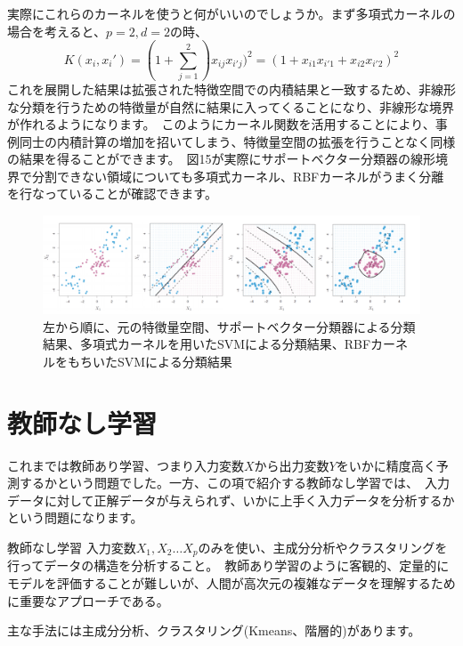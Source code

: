 \documentclass[uplatex]{jsarticle}
\begin{document}
実際にこれらのカーネルを使うと何がいいのでしょうか。まず多項式カーネルの場合を考えると、$p=2, d=2$の時、
$$K(x_i, x_i') = (1 + \sum_{j=1}^2)x_{ij}x_{i'j})^2 = (1 + x_{i1}x_{i'1} + x_{i2}x_{i'2})^2$$
これを展開した結果は拡張された特徴空間での内積結果と一致するため、非線形な分類を行うための特徴量が自然に結果に入ってくることになり、非線形な境界が作れるようになります。\
このようにカーネル関数を活用することにより、事例同士の内積計算の増加を招いてしまう、特徴量空間の拡張を行うことなく同様の結果を得ることができます。\
図15が実際にサポートベクター分類器の線形境界で分割できない領域についても多項式カーネル、RBFカーネルがうまく分離を行なっていることが確認できます。
\begin{figure}
  \begin{center}
    \includegraphics[width=15cm]{img/svm_c.png}
    \caption{左から順に、元の特徴量空間、サポートベクター分類器による分類結果、多項式カーネルを用いたSVMによる分類結果、RBFカーネルをもちいたSVMによる分類結果}
  \end{center}
\end{figure}

\section{教師なし学習}
これまでは教師あり学習、つまり入力変数$X$から出力変数$Y$をいかに精度高く予測するかという問題でした。一方、この項で紹介する教師なし学習では、\
入力データに対して正解データが与えられず、いかに上手く入力データを分析するかという問題になります。\
\begin{itembox}[l]{教師なし学習}
  入力変数$X_1, X_2 \dots X_p$のみを使い、主成分分析やクラスタリングを行ってデータの構造を分析すること。\
  教師あり学習のように客観的、定量的にモデルを評価することが難しいが、人間が高次元の複雑なデータを理解するために重要なアプローチである。
\end{itembox}
主な手法には主成分分析、クラスタリング(Kmeans、階層的)があります。
\end{document}
